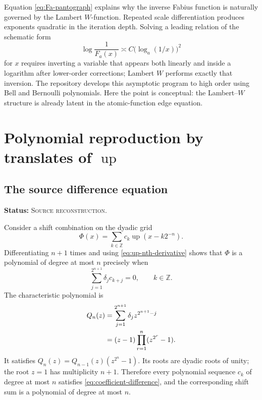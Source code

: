 \documentclass[11pt,oneside]{article}
\theoremstyle{definition}
\theoremstyle{remark}
\newcommand{\Up}{\operatorname{up}}
\newcommand{\Z}{\mathbb{Z}}
\newcommand{\SourceStatus}{\textcolor{SourceBlue}{\textsc{Source reconstruction}}}
\newcommand{\status}[1]{\par\smallskip\noindent\textbf{Status:} #1.\par\smallskip}
\begin{document}
Equation \eqref{eq:Fa-pantograph} explains why the inverse Fabius function is naturally governed by the Lambert \(W\)-function.  Repeated scale differentiation produces exponents quadratic in the iteration depth.  Solving a leading relation of the schematic form
\begin{equation}
  \log\frac1{F_a(x)}\asymp C\bigl(\log_a(1/x)\bigr)^2
  \label{eq:edge-log-square}
\end{equation}
for \(x\) requires inverting a variable that appears both linearly and inside a logarithm after lower-order corrections; Lambert \(W\) performs exactly that inversion.  The repository develops this asymptotic program to high order using Bell and Bernoulli polynomials.  Here the point is conceptual: the Lambert--\(W\) structure is already latent in the atomic-function edge equation.

\section{Polynomial reproduction by translates of \texorpdfstring{\(\Up\)}{up}}
\label{sec:polynomial-reproduction}

\subsection{The source difference equation}
\status{\SourceStatus}

Consider a shift combination on the dyadic grid
\begin{equation}
  \Phi(x)=\sum_{k\in\Z}c_k\Up(x-k2^{-n}).
  \label{eq:up-shift-combination}
\end{equation}
Differentiating \(n+1\) times and using \eqref{eq:up-nth-derivative} shows that \(\Phi\) is a polynomial of degree at most \(n\) precisely when
\begin{equation}
  \sum_{j=1}^{2^{n+1}}\delta_j c_{k+j}=0,
  \qquad k\in\Z.
  \label{eq:coefficient-difference}
\end{equation}
The characteristic polynomial is
\begin{align}
  Q_n(z)
   &=\sum_{j=1}^{2^{n+1}}\delta_j z^{2^{n+1}-j}
     \notag\\
   &=(z-1)\prod_{r=1}^{n}(z^{2^r}-1).
  \label{eq:Qn}
\end{align}
It satisfies \(Q_n(z)=Q_{n-1}(z)(z^{2^n}-1)\).  Its roots are dyadic roots of unity; the root \(z=1\) has multiplicity \(n+1\).  Therefore every polynomial sequence \(c_k\) of degree at most \(n\) satisfies \eqref{eq:coefficient-difference}, and the corresponding shift sum is a polynomial of degree at most \(n\).
\end{document}
